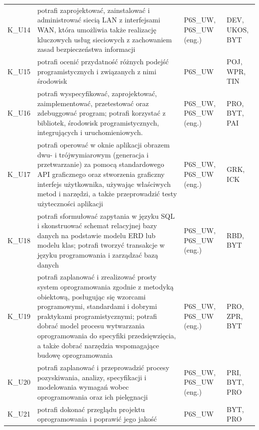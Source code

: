 \documentclass[12pt,a4paper]{article}
\begin{document}
{\begin{longtable}{m{1cm}m{8.8cm}m{2.1cm}m{2.5cm}}
\rowcolor{tableRowAlt} K\_U14 & potrafi zaprojektować, zainstalować i administrować siecią LAN z interfejsami WAN, która umożliwia także realizację kluczowych usług sieciowych z zachowaniem zasad bezpieczeństwa informacji & {\scriptsize P6S\_UW, P6S\_UW {\scriptsize (eng.)}} & {\scriptsize DEV, UKOS, BYT} \\
\rowcolor{tableRowLight} K\_U15 & potrafi ocenić przydatność różnych podejść programistycznych i związanych z nimi środowisk & {\scriptsize P6S\_UW} & {\scriptsize POJ, WPR, TIN} \\
\rowcolor{tableRowAlt} K\_U16 & potrafi wyspecyfikować, zaprojektować, zaimplementować, przetestować oraz zdebuggować program; potrafi korzystać z bibliotek, środowisk programistycznych, integrujących i uruchomieniowych. & {\scriptsize P6S\_UW, P6S\_UW {\scriptsize (eng.)}} & {\scriptsize PRO, BYT, PAI} \\
\rowcolor{tableRowLight} K\_U17 & potrafi operować w oknie aplikacji obrazem dwu- i trójwymiarowym (generacja i przetwarzanie) za pomocą standardowego API graficznego oraz stworzenia graficzny interfejs użytkownika, używając właściwych metod i narzędzi, a także przeprowadzić testy użyteczności aplikacji & {\scriptsize P6S\_UW, P6S\_UW {\scriptsize (eng.)}} & {\scriptsize GRK, ICK} \\
\rowcolor{tableRowAlt} K\_U18 & potrafi sformułować zapytania w języku SQL i skonstruować schemat relacyjnej bazy danych na podstawie modelu ERD lub modelu klas; potrafi tworzyć transakcje w języku programowania i zarządzać bazą danych & {\scriptsize P6S\_UW, P6S\_UW {\scriptsize (eng.)}} & {\scriptsize RBD, BYT} \\
\rowcolor{tableRowLight} K\_U19 & potrafi zaplanować i zrealizować prosty system oprogramowania zgodnie z metodyką obiektową, posługując się wzorcami programowymi, standardami i dobrymi praktykami programistycznymi; potrafi dobrać model procesu wytwarzania oprogramowania do specyfiki przedsięwzięcia, a także dobrać narzędzia wspomagające budowę oprogramowania & {\scriptsize P6S\_UW, P6S\_UW {\scriptsize (eng.)}} & {\scriptsize PRO, ZPR, BYT} \\
\rowcolor{tableRowAlt} K\_U20 & potrafi zaplanować i przeprowadzić procesy pozyskiwania, analizy, specyfikacji i modelowania wymagań wobec oprogramowania oraz ich pielęgnacji & {\scriptsize P6S\_UW, P6S\_UW {\scriptsize (eng.)}} & {\scriptsize PRI, BYT, PRO} \\
\rowcolor{tableRowLight} K\_U21 & potrafi dokonać przeglądu projektu oprogramowania i poprawić jego jakość & {\scriptsize P6S\_UW} & {\scriptsize BYT, PRO} \\

\end{longtable}}
\end{document}
